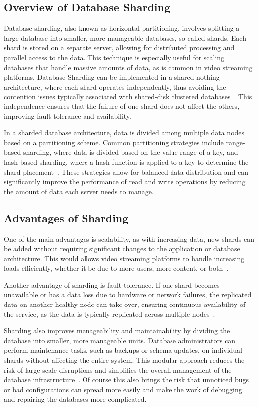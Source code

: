 \subsection{Overview of Database Sharding}
Database sharding, also known as horizontal partitioning, involves splitting a large database into smaller, more manageable databases, so called shards. Each shard is stored on a separate server, allowing for distributed processing and parallel access to the data. This technique is especially useful for scaling databases that handle massive amounts of data, as is common in video streaming platforms. Database Sharding can be implemented in a shared-nothing architecture, where each shard operates independently, thus avoiding the contention issues typically associated with shared-disk clustered databases~\parencite{db_sharding}. This independence ensures that the failure of one shard does not affect the others, improving fault tolerance and availability.

In a sharded database architecture, data is divided among multiple data nodes based on a partitioning scheme. Common partitioning strategies include range-based sharding, where data is divided based on the value range of a key, and hash-based sharding, where a hash function is applied to a key to determine the shard placement~\parencite{db_sharding}. These strategies allow for balanced data distribution and can significantly improve the performance of read and write operations by reducing the amount of data each server needs to manage.

\subsection{Advantages of Sharding}
One of the main advantages is scalability, as with increasing data, new shards can be added without requiring significant changes to the application or database architecture. This would allows video streaming platforms to handle increasing loads efficiently, whether it be due to more users, more content, or both~\parencite{db_sharding}.

Another advantage of sharding is fault tolerance. If one shard becomes unavailable or has a data loss due to hardware or network failures, the replicated data on another healthy node can take over, ensuring continuous availability of the service, as the data is typically replicated across multiple nodes~\parencite{db_sharding}.

Sharding also improves manageability and maintainability by dividing the database into smaller, more manageable units. Database administrators can perform maintenance tasks, such as backups or schema updates, on individual shards without affecting the entire system. This modular approach reduces the risk of large-scale disruptions and simplifies the overall management of the database infrastructure~\parencite{db_sharding}. Of course this also brings the risk that unnoticed bugs or bad configurations can spread more easily and make the work of debugging and repairing the databases more complicated. 

